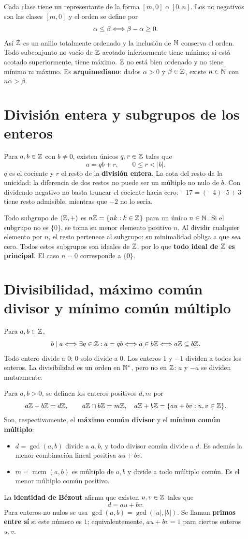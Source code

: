 Cada clase tiene un representante de la forma $[m,0]$ o $[0,n]$.
Los no negativos son las clases $[m,0]$ y el orden se define por
\[
 \alpha\le\beta\Longleftrightarrow\beta-\alpha\ge0.
\]
Así $\mathbb{Z}$ es un anillo totalmente ordenado y la inclusión de $\mathbb{N}$
conserva el orden. Todo subconjunto no vacío de $\mathbb{Z}$ acotado inferiormente
tiene mínimo; si está acotado superiormente, tiene máximo.
$\mathbb{Z}$ no está bien ordenado y no tiene mínimo ni máximo.
Es \textbf{arquimediano}: dados $\alpha>0$ y $\beta\in\mathbb{Z}$, existe
$n\in\mathbb{N}$ con $n\alpha>\beta$.

\section{División entera y subgrupos de los enteros}
\label{sec:division-entera}
Para $a,b\in\mathbb{Z}$ con $b\ne0$, existen únicos $q,r\in\mathbb{Z}$ tales que
\[
 a=qb+r,\qquad 0\le r<|b|.
\]
$q$ es el cociente y $r$ el resto de la \textbf{división entera}.
La cota del resto da la unicidad: la diferencia de dos restos no puede
ser un múltiplo no nulo de $b$.
Con dividendo negativo no basta truncar el cociente hacia cero:
$-17=(-4)\cdot5+3$ tiene resto admisible, mientras que $-2$ no lo sería.

Todo subgrupo de $(\mathbb{Z},+)$ es $n\mathbb{Z}=\{nk:k\in\mathbb{Z}\}$ para un único
$n\in\mathbb{N}$. Si el subgrupo no es $\{0\}$, se toma su menor elemento
positivo $n$. Al dividir cualquier elemento por $n$, el resto pertenece
al subgrupo; su minimalidad obliga a que sea cero.
Todos estos subgrupos son ideales de $\mathbb{Z}$, por lo que \textbf{todo ideal
de $\mathbb{Z}$ es principal}. El caso $n=0$ corresponde a $\{0\}$.

\section{Divisibilidad, máximo común divisor y mínimo común múltiplo}
\label{sec:divisibilidad}
Para $a,b\in\mathbb{Z}$,
\[
 b\mid a\Longleftrightarrow\exists q\in\mathbb{Z}: a=qb
 \Longleftrightarrow a\in b\mathbb{Z}\Longleftrightarrow a\mathbb{Z}\subseteq b\mathbb{Z}.
\]
Todo entero divide a $0$; $0$ solo divide a $0$. Los enteros $1$ y $-1$
dividen a todos los enteros. La divisibilidad es un orden en $\mathbb{N}^*$,
pero no en $\mathbb{Z}$: $a$ y $-a$ se dividen mutuamente.

Para $a,b>0$, se definen los enteros positivos $d,m$ por
\[
 a\mathbb{Z}+b\mathbb{Z}=d\mathbb{Z},\qquad a\mathbb{Z}\cap b\mathbb{Z}=m\mathbb{Z},
 \quad a\mathbb{Z}+b\mathbb{Z}=\{au+bv:u,v\in\mathbb{Z}\}.
\]
Son, respectivamente, el \textbf{máximo común divisor} y el
\textbf{mínimo común múltiplo}:
\begin{itemize}
\item $d=\gcd(a,b)$ divide a $a,b$, y todo divisor común divide a $d$.
Es además la menor combinación lineal positiva $au+bv$.
\item $m=\operatorname{mcm}(a,b)$ es múltiplo de $a,b$ y divide a todo
múltiplo común. Es el menor múltiplo común positivo.
\end{itemize}
La \textbf{identidad de Bézout} afirma que existen $u,v\in\mathbb{Z}$ tales que
\[
 d=au+bv.
\]
Para enteros no nulos se usa $\gcd(a,b)=\gcd(|a|,|b|)$.
Se llaman \textbf{primos entre sí} si este número es $1$;
equivalentemente, $au+bv=1$ para ciertos enteros $u,v$.

